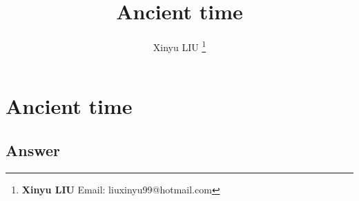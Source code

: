 \documentclass[b5paper]{article}
\begin{document}
\title{Ancient time}

\author{Xinyu LIU
\thanks{{\bfseries Xinyu LIU} \newline
  Email: liuxinyu99@hotmail.com \newline}
  }

\maketitle
\fi


\ifx\wholebook\relax
\chapter{Ancient time}
\fi



\ifx\wholebook\relax \else
\section{Answer}
\shipoutAnswer

\begin{thebibliography}{99}




\end{thebibliography}

\expandafter\enddocument

\fi
\end{document}
